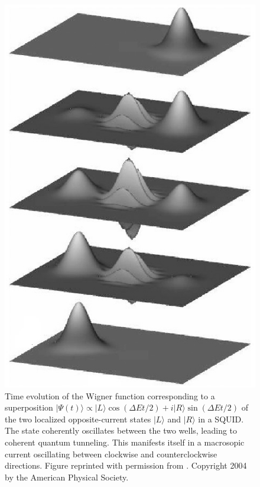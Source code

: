 \documentclass[12pt,aps,floatfix,amsmath,amssymb,showpacs,nofootinbib]{revtex4-2}
\newcommand{\ket}[1]{\ensuremath{|{#1\rangle}}}
\begin{document}
\begin{figure}
\begin{center}
\includegraphics[scale=.25]{dec.eps}
\end{center}
\caption[Time evolution of the Wigner function
corresponding to a superposition $\ket{\Psi(t)} \propto \ket{L} \cos
(\Delta E t / 2) + i \ket{R} \sin(\Delta E t / 2)$ of the two
localized opposite-current states $\ket{L}$ and $\ket{R}$ in a
SQUID]{\label{fig:wigner1} Time evolution of the Wigner function
  corresponding to a superposition $\ket{\Psi(t)} \propto \ket{L} \cos
  (\Delta E t / 2) + i \ket{R} \sin(\Delta E t / 2)$ of the two
  localized opposite-current states $\ket{L}$ and $\ket{R}$ in a
  SQUID.  The state coherently oscillates between the two wells,
  leading to coherent quantum tunneling. This manifests itself in a
  macrosopic current oscillating between clockwise and
  counterclockwise directions.  Figure reprinted with permission from
  \cite{Everitt:2004:mb}. Copyright 2004 by the American Physical
  Society.  }
\end{figure}
\end{document}
